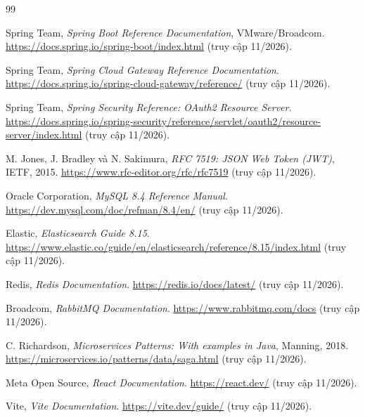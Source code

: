 
\renewcommand{\bibname}{TÀI LIỆU THAM KHẢO}

\begin{thebibliography}{99}

Spring Team, \textit{Spring Boot Reference Documentation}, VMware/Broadcom.
\url{https://docs.spring.io/spring-boot/index.html} (truy cập 11/2026).

Spring Team, \textit{Spring Cloud Gateway Reference Documentation}.
\url{https://docs.spring.io/spring-cloud-gateway/reference/} (truy cập 11/2026).

Spring Team, \textit{Spring Security Reference: OAuth2 Resource Server}.
\url{https://docs.spring.io/spring-security/reference/servlet/oauth2/resource-server/index.html} (truy cập 11/2026).

M. Jones, J. Bradley và N. Sakimura, \textit{RFC 7519: JSON Web Token (JWT)}, IETF, 2015.
\url{https://www.rfc-editor.org/rfc/rfc7519} (truy cập 11/2026).

Oracle Corporation, \textit{MySQL 8.4 Reference Manual}.
\url{https://dev.mysql.com/doc/refman/8.4/en/} (truy cập 11/2026).

Elastic, \textit{Elasticsearch Guide 8.15}.
\url{https://www.elastic.co/guide/en/elasticsearch/reference/8.15/index.html} (truy cập 11/2026).

Redis, \textit{Redis Documentation}.
\url{https://redis.io/docs/latest/} (truy cập 11/2026).

Broadcom, \textit{RabbitMQ Documentation}.
\url{https://www.rabbitmq.com/docs} (truy cập 11/2026).

C. Richardson, \textit{Microservices Patterns: With examples in Java}, Manning, 2018.
\url{https://microservices.io/patterns/data/saga.html} (truy cập 11/2026).

Meta Open Source, \textit{React Documentation}.
\url{https://react.dev/} (truy cập 11/2026).

Vite, \textit{Vite Documentation}.
\url{https://vite.dev/guide/} (truy cập 11/2026).


\end{thebibliography}
